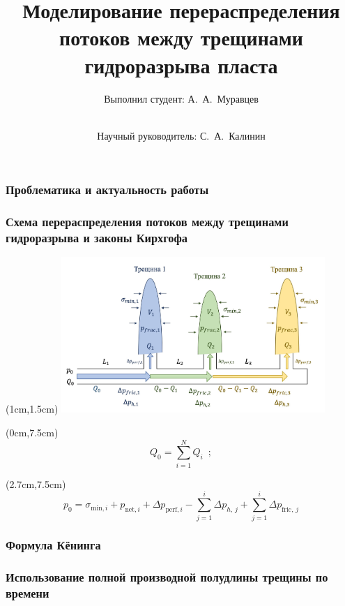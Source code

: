 \documentclass{beamer}
\title{Моделирование перераспределения потоков между трещинами гидроразрыва пласта}
\subtitle{}
\author{Выполнил студент: А.~А.~Муравцев\and \\Научный руководитель: С.~А.~Калинин}
\begin{document}
\begin{frame}
\titlepage
\end{frame}


\begin{frame}
\frametitle{Проблематика и актуальность работы}
\end{frame}


\begin{frame}
\frametitle{Схема перераспределения потоков между трещинами гидроразрыва и законы Кирхгофа}

\begin{textblock*}{10cm}(1cm,1.5cm)
\includegraphics[width=10cm]{flow_distribution_scheme.jpg}
\end{textblock*}

\begin{textblock*}{4cm}(0cm,7.5cm)
$$Q_0=\sum\limits_{i=1}^{N}Q_i\,\,\,;$$
\end{textblock*}

\begin{textblock*}{10.5cm}(2.7cm,7.5cm)
$$p_0=\sigma_{\text{min},i}+p_{\text{net},i}+\Delta p_{\text{perf},i}-\sum_{j=1}^{i}{\Delta p_{h,\,j}}+\sum_{j=1}^{i}\Delta p_{\text{fric},\,j}$$
\end{textblock*}

\end{frame}


\begin{frame}
\frametitle{Формула Кёнинга}


\end{frame}


\begin{frame}
\frametitle{Использование полной производной полудлины трещины по времени}


\end{frame}
\end{document}
